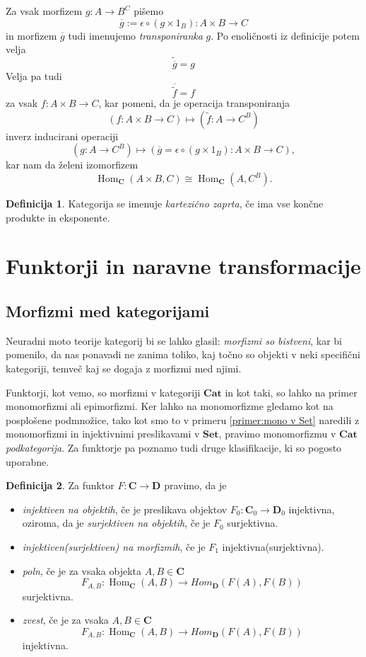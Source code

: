 \documentclass[12pt,a4paper]{book}
\theoremstyle{definition}
\newtheorem{definicija}{Definicija}[chapter]
\theoremstyle{plain}
\theoremstyle{definition}
\theoremstyle{remark}
\newcommand{\cat}[1]{\textbf{#1}}
\DeclareMathOperator{\Hom}{Hom}
\begin{document}
Za vsak morfizem $g : A \to B^C$ pišemo
$$ \overline{g} := \epsilon \circ (g \times 1_B) : A \times B \to C$$
in morfizem $\overline{g}$ tudi imenujemo \emph{transponiranka} $g$. Po enoličnosti iz definicije potem velja
$$\widetilde{\overline{g}} = g$$
Velja pa tudi
$$\overline{\widetilde{f}} = f$$
za vsak $f : A \times B \to C$, kar pomeni, da je operacija transponiranja
$$(f : A \times B \to C) \mapsto (\widetilde{f} : A \to C^B)$$
inverz inducirani operaciji
$$(g : A \to C^B) \mapsto (\overline{g} = \epsilon \circ (g \times 1_B) : A \times B \to C),$$
kar nam da želeni izomorfizem
$$\Hom_{\cat{C}}(A \times B, C) \cong \Hom_{\cat{C}}(A, C^B).$$

\begin{definicija}
Kategorija se imenuje \emph{kartezično zaprta}, če ima vse končne produkte in eksponente.
\end{definicija}

\section[Funktorji in transformacije]{Funktorji in naravne transformacije}

\subsection{Morfizmi med kategorijami}

Neuradni moto teorije kategorij bi se lahko glasil: \emph{morfizmi so bistveni},
kar bi pomenilo, da nas ponavadi ne zanima toliko, kaj točno so objekti v neki specifični kategoriji, temveč kaj se dogaja z morfizmi med njimi.

Funktorji, kot vemo, so morfizmi v kategoriji $\cat{Cat}$ in kot taki, so lahko na primer monomorfizmi ali epimorfizmi. Ker lahko na monomorfizme gledamo kot na posplošene podmnožice, tako kot smo to v primeru \ref{primer:mono v Set} naredili z monomorfizmi in injektivnimi preslikavami v $\cat{Set}$, pravimo monomorfizmu v $\cat{Cat}$ \emph{podkategorija}. Za funktorje pa poznamo tudi druge klasifikacije, ki so pogosto uporabne.

\begin{definicija}
Za funktor $F : \cat{C} \to \cat{D}$ pravimo, da je 
\begin{itemize}
\item \emph{injektiven na objektih}, če je preslikava objektov $F_0 : \cat{C}_0 \to \cat{D}_0$ injektivna, oziroma, da je \emph{surjektiven na objektih}, če je $F_0$ surjektivna.
\item \emph{injektiven(surjektiven) na morfizmih}, če je $F_1$ injektivna(surjektivna).
\item \emph{poln}, če je za vsaka objekta $A,B \in \cat{C}$
$$F_{A,B} : \Hom_{\cat{C}}(A,B) \to Hom_{\cat{D}}(F(A),F(B))$$
surjektivna.
\item \emph{zvest}, če je za vsaka $A,B \in \cat{C}$
$$F_{A,B} : \Hom_{\cat{C}}(A,B) \to Hom_{\cat{D}}(F(A),F(B))$$
injektivna.
\end{itemize}
\end{definicija}
\end{document}
